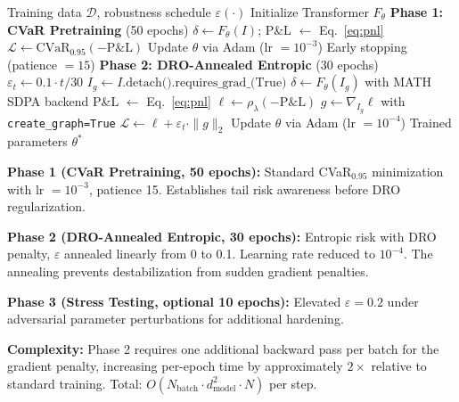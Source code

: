 \documentclass[11pt]{article}
\newcommand{\cvar}{\mathrm{CVaR}}
\begin{document}
\begin{algorithm}[t]
\caption{W-DRO-T Training Protocol}
\label{alg:wdrot}
\begin{algorithmic}[1]
\REQUIRE Training data $\mathcal{D}$, robustness schedule $\varepsilon(\cdot)$
\STATE Initialize Transformer $F_\theta$
\STATE \textbf{Phase 1: CVaR Pretraining} (50 epochs)
        \STATE $\delta \gets F_\theta(I)$; \quad P\&L $\gets$ Eq.~\eqref{eq:pnl}
        \STATE $\mathcal{L} \gets \cvar_{0.95}(-\text{P\&L})$
        \STATE Update $\theta$ via Adam (lr $= 10^{-3}$)
    \ENDFOR
    \STATE Early stopping (patience $= 15$)
\ENDFOR
\STATE \textbf{Phase 2: DRO-Annealed Entropic} (30 epochs)
    \STATE $\varepsilon_t \gets 0.1 \cdot t / 30$ 
        \STATE $I_g \gets I.\text{detach().requires\_grad\_(True)}$
        \STATE $\delta \gets F_\theta(I_g)$ with MATH SDPA backend
        \STATE P\&L $\gets$ Eq.~\eqref{eq:pnl}
        \STATE $\ell \gets \rho_\lambda(-\text{P\&L})$
        \STATE $g \gets \nabla_{I_g} \ell$ with \texttt{create\_graph=True}
        \STATE $\mathcal{L} \gets \ell + \varepsilon_t \cdot \|g\|_2$
        \STATE Update $\theta$ via Adam (lr $= 10^{-4}$)
    \ENDFOR
\ENDFOR
\RETURN Trained parameters $\theta^*$
\end{algorithmic}
\end{algorithm}

\textbf{Phase 1 (CVaR Pretraining, 50 epochs):} Standard CVaR$_{0.95}$ minimization with lr $= 10^{-3}$, patience 15. Establishes tail risk awareness before DRO regularization.

\textbf{Phase 2 (DRO-Annealed Entropic, 30 epochs):} Entropic risk with DRO penalty, $\varepsilon$ annealed linearly from 0 to 0.1. Learning rate reduced to $10^{-4}$. The annealing prevents destabilization from sudden gradient penalties.

\textbf{Phase 3 (Stress Testing, optional 10 epochs):} Elevated $\varepsilon = 0.2$ under adversarial parameter perturbations for additional hardening.

\textbf{Complexity:} Phase 2 requires one additional backward pass per batch for the gradient penalty, increasing per-epoch time by approximately $2\times$ relative to standard training. Total: $O(N_{\mathrm{batch}} \cdot d_{\mathrm{model}}^2 \cdot N)$ per step.

\end{document}
